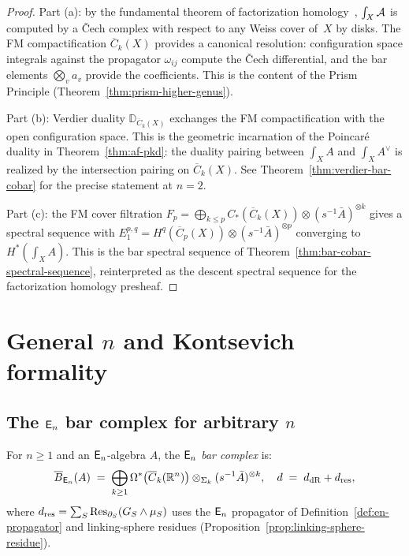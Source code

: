 \begin{proof}
Part (a): by the fundamental theorem of factorization
homology~\cite{AF15}, $\int_X \mathcal{A}$ is computed by a \v{C}ech complex
with respect to any Weiss cover of~$X$ by disks.  The FM
compactification $\overline{C}_k(X)$ provides a canonical
resolution: configuration space integrals against the propagator
$\omega_{ij}$ compute the \v{C}ech differential, and the bar
elements $\bigotimes_v a_v$ provide the coefficients.  This is the
content of the Prism Principle
(Theorem~\ref{thm:prism-higher-genus}).

Part (b): Verdier duality $\mathbb{D}_{\overline{C}_k(X)}$ exchanges the
FM compactification with the open configuration space.  This is the
geometric incarnation of the Poincar\'e duality in
Theorem~\ref{thm:af-pkd}: the duality pairing between
$\int_X A$ and $\int_X A^\vee$ is realized by the intersection
pairing on $\overline{C}_k(X)$.  See
Theorem~\ref{thm:verdier-bar-cobar} for the precise statement
at $n = 2$.

Part (c): the FM cover filtration
$F_p = \bigoplus_{k \leq p} C_*(\overline{C}_k(X))
\otimes (s^{-1} \bar{A})^{\otimes k}$
gives a spectral sequence with
$E_1^{p,q} = H^q(\overline{C}_p(X)) \otimes (s^{-1}\bar{A})^{\otimes p}$
converging to $H^*(\int_X A)$.  This is the bar spectral sequence
of Theorem~\ref{thm:bar-cobar-spectral-sequence}, reinterpreted as
the descent spectral sequence for the factorization homology
presheaf.
\end{proof}



\section{\texorpdfstring{General $n$ and Kontsevich formality}{General n and Kontsevich formality}}
\label{sec:general-n-formality}

\subsection{\texorpdfstring{The $\mathsf{E}_n$ bar complex for arbitrary $n$}{The En bar complex for arbitrary n}}

\begin{definition}
\label{def:en-bar-general}
For $n \geq 1$ and an $\mathsf{E}_n$-algebra $A$, the \emph{$\mathsf{E}_n$ bar complex}
is:
\begin{equation}\label{eq:en-bar-general}
\overline{B}_{\mathsf{E}_n}(A)
\;=\;
\bigoplus_{k \geq 1}
\Omega^*\bigl(\overline{C}_k(\mathbb{R}^n)\bigr)
\otimes_{\Sigma_k} (s^{-1}\bar{A})^{\otimes k},
\quad
d \;=\; d_{\mathrm{dR}} + d_{\mathrm{res}},
\end{equation}
where $d_{\mathrm{res}} = \sum_S \operatorname{Res}_{\partial_S}(G_S \wedge \mu_S)$
uses the $\mathsf{E}_n$ propagator of Definition~\textup{\ref{def:en-propagator}}
and linking-sphere residues
\textup{(}Proposition~\textup{\ref{prop:linking-sphere-residue})}.
\end{definition}

